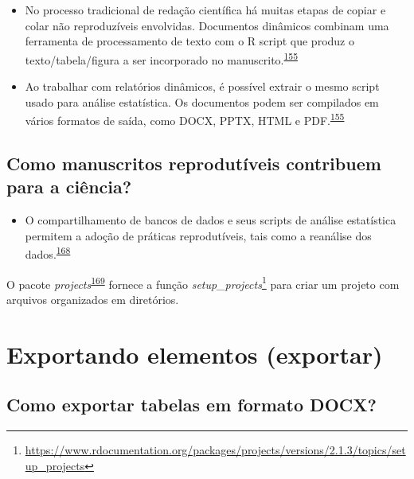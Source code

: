 \documentclass[
]{book}
\providecommand{\tightlist}{%
  \setlength{\itemsep}{0pt}\setlength{\parskip}{0pt}}
\renewcommand{\href}[2]{#2\footnote{\url{#1}}}
\newenvironment{infobox}[1]
  {
  \begin{itemize}
  \renewcommand{\labelitemi}{
    \raisebox{-.7\height}[0pt][0pt]{
      {\setkeys{Gin}{width=3em,keepaspectratio}
        \texttt{[image: \#1]}}
    }
  }
  \setlength{\fboxsep}{1em}
  \begin{blackbox}
  \item
  }
  {
  \end{blackbox}
  \end{itemize}
  }
\begin{document}
\begin{itemize}
\item
  No processo tradicional de redação científica há muitas etapas de copiar e colar não reproduzíveis envolvidas. Documentos dinâmicos combinam uma ferramenta de processamento de texto com o R script que produz o texto/tabela/figura a ser incorporado no manuscrito.\textsuperscript{\protect\hyperlink{ref-mair2016}{155}}
\item
  Ao trabalhar com relatórios dinâmicos, é possível extrair o mesmo script usado para análise estatística. Os documentos podem ser compilados em vários formatos de saída, como DOCX, PPTX, HTML e PDF.\textsuperscript{\protect\hyperlink{ref-mair2016}{155}}
\end{itemize}

\hypertarget{como-manuscritos-reprodutuxedveis-contribuem-para-a-ciuxeancia}{%
\subsection{Como manuscritos reprodutíveis contribuem para a ciência?}\label{como-manuscritos-reprodutuxedveis-contribuem-para-a-ciuxeancia}}

\begin{itemize}
\tightlist
\item
  O compartilhamento de bancos de dados e seus scripts de análise estatística permitem a adoção de práticas reprodutíveis, tais como a reanálise dos dados.\textsuperscript{\protect\hyperlink{ref-ioannidis2014}{168}}
\end{itemize}

\begin{infobox}{images/Rlogo}
O pacote \emph{projects}\textsuperscript{\protect\hyperlink{ref-projects}{169}} fornece a função \href{https://www.rdocumentation.org/packages/projects/versions/2.1.3/topics/setup_projects}{\emph{setup\_projects}} para criar um projeto com arquivos organizados em diretórios.

\end{infobox}

\hypertarget{exportando-elementos-exportar}{%
\section{Exportando elementos (exportar)}\label{exportando-elementos-exportar}}

\hypertarget{como-exportar-tabelas-em-formato-docx}{%
\subsection{Como exportar tabelas em formato DOCX?}\label{como-exportar-tabelas-em-formato-docx}}
\end{document}

